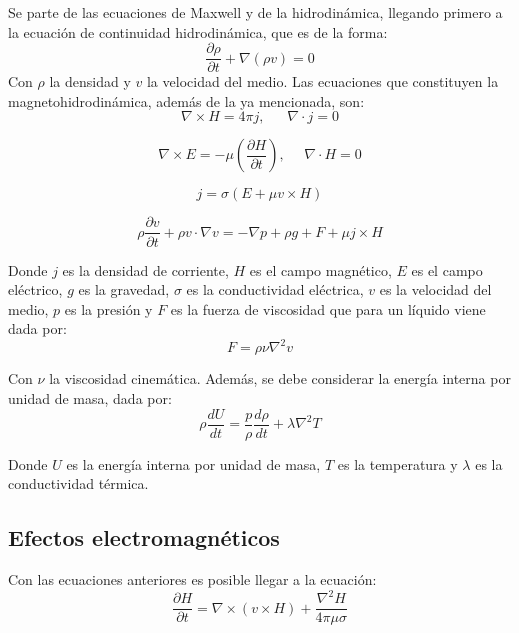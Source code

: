 Se parte de las ecuaciones de Maxwell y de la hidrodinámica, llegando primero a la ecuación de continuidad hidrodinámica, que es de la forma:
\begin{equation}
\frac{\partial \rho}{\partial t}+\nabla(\rho v)=0
\end{equation}
Con $\rho$ la densidad y $v$ la velocidad del medio.
Las ecuaciones que constituyen la magnetohidrodinámica, además de la ya mencionada, son:
\begin{equation}
\nabla \times H=4\pi j,   ~~~~~~~\nabla \cdot j=0
\end{equation}


\begin{equation}
\nabla \times E=-\mu(\frac{\partial H}{\partial t}),~~~~~~\nabla \cdot H=0
\end{equation}

\begin{equation}
j=\sigma(E+\mu v\times H)
\end{equation}

\begin{equation}
\rho\frac{\partial v}{\partial t}+\rho v\cdot \nabla v=-\nabla p+\rho g+F+\mu j\times H
\end{equation}

Donde $j$ es la densidad de corriente, $H$ es el campo magnético, $E$ es el campo eléctrico, $g$ es la gravedad, $\sigma$ es la conductividad eléctrica, $v$ es la velocidad del medio, $p$ es la presión y $F$ es la fuerza de viscosidad que para un líquido viene dada por:
\begin{equation}
F=\rho \nu \nabla^{2}v
\end{equation}

Con $\nu$ la viscosidad cinemática.
Además, se debe considerar la energía interna por unidad de masa, dada por:
\begin{equation}
\rho\frac{dU}{dt}=\frac{p}{\rho}\frac{d\rho}{dt}+\lambda \nabla ^{2}T
\end{equation}

Donde $U$ es la energía interna por unidad de masa, $T$ es la temperatura y $\lambda$ es la conductividad térmica.

\subsection{Efectos electromagnéticos}

Con las ecuaciones anteriores es posible llegar a la ecuación:
\begin{equation}
\frac{\partial H}{\partial t}=\nabla \times(v\times H)+\frac{\nabla^{2}H}{4\pi \mu \sigma}
\end{equation}

